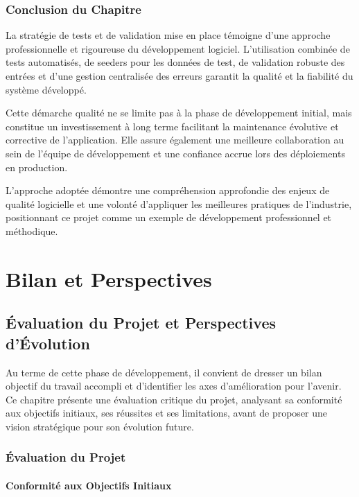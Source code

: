 \documentclass[12pt,a4paper]{report}
\begin{document}
\section{Conclusion du Chapitre}

La stratégie de tests et de validation mise en place témoigne d'une approche professionnelle et rigoureuse du développement logiciel. L'utilisation combinée de tests automatisés, de seeders pour les données de test, de validation robuste des entrées et d'une gestion centralisée des erreurs garantit la qualité et la fiabilité du système développé.

Cette démarche qualité ne se limite pas à la phase de développement initial, mais constitue un investissement à long terme facilitant la maintenance évolutive et corrective de l'application. Elle assure également une meilleure collaboration au sein de l'équipe de développement et une confiance accrue lors des déploiements en production.

L'approche adoptée démontre une compréhension approfondie des enjeux de qualité logicielle et une volonté d'appliquer les meilleures pratiques de l'industrie, positionnant ce projet comme un exemple de développement professionnel et méthodique.



\part{Bilan et Perspectives}

\chapter{Évaluation du Projet et Perspectives d'Évolution}

Au terme de cette phase de développement, il convient de dresser un bilan objectif du travail accompli et d'identifier les axes d'amélioration pour l'avenir. Ce chapitre présente une évaluation critique du projet, analysant sa conformité aux objectifs initiaux, ses réussites et ses limitations, avant de proposer une vision stratégique pour son évolution future.

\section{Évaluation du Projet}

\subsection{Conformité aux Objectifs Initiaux}
\end{document}
